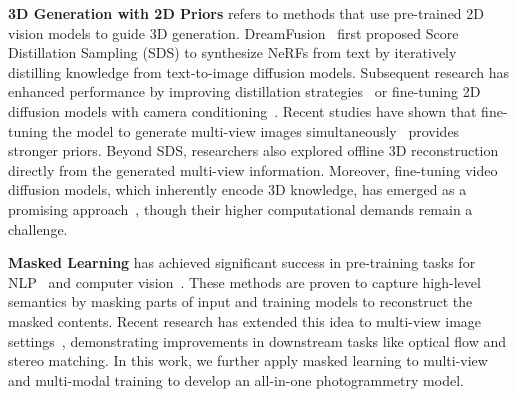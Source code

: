 \textbf{3D Generation with 2D Priors} refers to methods that use pre-trained 2D vision models to guide 3D generation. DreamFusion~\cite{poole2022dreamfusion} first proposed Score Distillation Sampling (SDS) to synthesize NeRFs from text by iteratively distilling knowledge from text-to-image diffusion models. Subsequent research has enhanced performance by improving distillation strategies~\cite{huang2023dreamtime, wang2023prolificdreamer, chen2023fantasia3d, zeng2024stag4d, haque2023instruct, tang2023dreamgaussian, zhang2024jointnet} or fine-tuning 2D diffusion models with camera conditioning~\cite{wu2024reconfusion, liu2023zero, raj2023dreambooth3d, chan2023generative, gu2023nerfdiff, sargent2023zeronvs, liu2024one}. Recent studies have shown that fine-tuning the model to generate multi-view images simultaneously~\cite{shi2023mvdream, tang2023mvdiffusion, liu2024one2345, shi2023zero123++, yang2024consistnet} provides stronger priors. Beyond SDS, researchers also explored offline 3D reconstruction~\cite{liu2023syncdreamer, long2023wonder3d, lu2024direct2, gao2024cat3d} directly from the generated multi-view information. Moreover, fine-tuning video diffusion models, which inherently encode 3D knowledge, has emerged as a promising approach~\cite{kwak2024vivid, voleti2024sv3d, melas20243d, guo2023animatediff}, though their higher computational demands remain a challenge.

\textbf{Masked Learning} has achieved significant success in pre-training tasks for NLP~\cite{kenton2019bert, brown2020language, radford2018improving, radford2019language} and computer vision~\cite{he2022masked, bachmann2022multimae, li2021mst}. These methods are proven to capture high-level semantics by masking parts of input and training models to reconstruct the masked contents. Recent research has extended this idea to multi-view image settings~\cite{weinzaepfel2022croco, weinzaepfel2023croco}, demonstrating improvements in downstream tasks like optical flow and stereo matching. In this work, we further apply masked learning to multi-view and multi-modal training to develop an all-in-one photogrammetry model.

